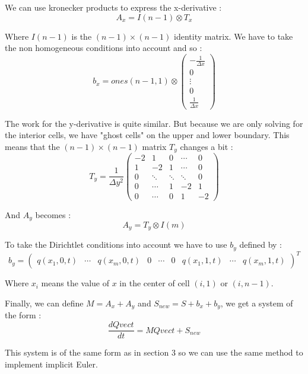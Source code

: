 We can use kronecker products to express the x-derivative :
$$A_x = I(n-1)\otimes T_x$$

Where $I(n-1)$ is the $(n-1)\times (n-1)$ identity matrix. We have to take the non homogeneous conditions into account and so :
$$b_x = ones(n-1,1) \otimes \left(\begin{array}{c}
-\frac{1}{\Delta x} \\ 
0 \\ 
\vdots \\ 
0 \\ 
\frac{1}{\Delta x}
\end{array}\right)$$

The work for the y-derivative is quite similar. But because we are only solving for the interior cells, we have "ghost cells" on the upper and lower boundary. This means that the $(n-1)\times (n-1)$ matrix $T_y$ changes a bit : 
$$T_y = \frac{1}{\Delta y^2}\left(\begin{array}{ccccc}
-2 & 1 & 0 & \cdots & 0 \\ 
1 & -2 & 1 & \cdots & 0 \\ 
0& \ddots & \ddots & \ddots & 0 \\ 
0 & \cdots & 1 & -2 & 1 \\
0 & \cdots & 0 & 1 & -2
\end{array}\right) $$

And $A_y$ becomes : 
$$A_y = T_y \otimes I(m)$$

To take the Dirichtlet conditions into account we have to use $b_y$ defined by :
$$b_y = \left(\begin{array}{ccccccccc}
q(x_1,0,t) & \cdots & q(x_m,0,t) & 0 & \cdots & 0 & q(x_1,1,t) & \cdots & q(x_m,1,t)
\end{array}\right)^T $$

Where $x_i$ means the value of $x$ in the center of cell $(i,1)$ or $(i,n-1)$.

Finally, we can define $M=A_x+A_y$ and $S_{new}=S+b_x+b_y$, we get a system of the form :
$$\frac{dQvect}{dt}=MQvect+S_{new}$$

This system is of the same form as in section 3 so we can use the same method to implement implicit Euler.




